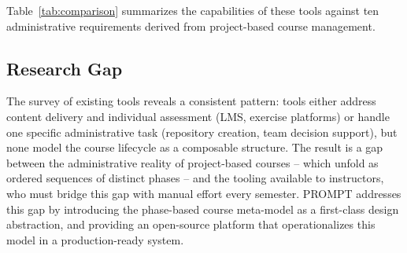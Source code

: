 Table~\ref{tab:comparison} summarizes the capabilities of these tools against ten administrative requirements derived from project-based course management.

\subsection{Research Gap}

The survey of existing tools reveals a consistent pattern:
tools either address content delivery and individual assessment (LMS, exercise platforms) or handle one specific administrative task (repository creation, team decision support), but none model the course lifecycle as a composable structure.
The result is a gap between the administrative reality of project-based courses -- which unfold as ordered sequences of distinct phases -- and the tooling available to instructors, who must bridge this gap with manual effort every semester.
PROMPT addresses this gap by introducing the phase-based course meta-model as a first-class design abstraction, and providing an open-source platform that operationalizes this model in a production-ready system.
